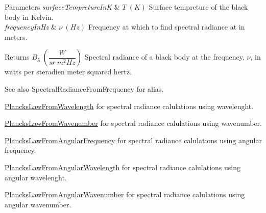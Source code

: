 \begin{DoxyParams}{Parameters}
{\em surface\+Tempreture\+InK} & $T\ (K)$ Surface tempreture of the black body in Kelvin. \\
\hline
{\em frequency\+In\+Hz} & $\nu\ (Hz)$ Frequency at which to find spectral radiance at in meters. \\
\hline
\end{DoxyParams}
\begin{DoxyReturn}{Returns}
$B_{\lambda}\ ( \dfrac{W}{sr\ m^2 Hz})$ Spectral radiance of a black body at the frequency, $\nu$, in watts per steradien meter squared hertz. 
\end{DoxyReturn}
\begin{DoxySeeAlso}{See also}
Spectral\+Radiance\+From\+Frequency for alias. 

\mbox{\hyperlink{group___e_g_x_phys-_electrodynamics-_black_body-_plancks_law_ga54639bc031ded51ef78aa82b0457a4dd}{Plancks\+Law\+From\+Wavelength}} for spectral radiance calulations using wavelenght. 

\mbox{\hyperlink{group___e_g_x_phys-_electrodynamics-_black_body-_plancks_law_ga6648ae2a0fbff6735c1e1a04c7cac746}{Plancks\+Law\+From\+Wavenumber}} for spectral radiance calulations using wavenumber. 

\mbox{\hyperlink{group___e_g_x_phys-_electrodynamics-_black_body-_plancks_law_gaac540560c71e30c02b91d22e417b5863}{Plancks\+Law\+From\+Angular\+Frequency}} for spectral radiance calulations using angular frequency. 

\mbox{\hyperlink{group___e_g_x_phys-_electrodynamics-_black_body-_plancks_law_ga7322124727f968d28807e918c5eeb23f}{Plancks\+Law\+From\+Angular\+Wavelength}} for spectral radiance calulations using angular wavelenght. 

\mbox{\hyperlink{group___e_g_x_phys-_electrodynamics-_black_body-_plancks_law_gaa3d3e0fdb77d25bdd40523f9975de902}{Plancks\+Law\+From\+Angular\+Wavenumber}} for spectral radiance calulations using angular wavenumber. 
\end{DoxySeeAlso}
\mbox{\label{group___e_g_x_phys-_electrodynamics-_black_body-_plancks_law_ga54639bc031ded51ef78aa82b0457a4dd}} 
